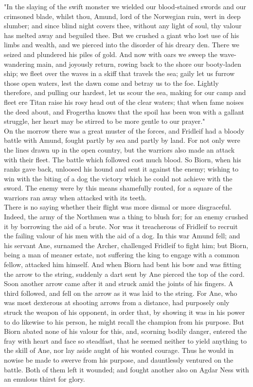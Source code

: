 \documentclass[10pt,a4paper]{report}
\begin{document}
"In the slaying of the swift monster we wielded our blood-stained swords and our crimsoned blade, whilst thou, Amund, lord of the Norwegian ruin, wert in deep slumber; and since blind night covers thee, without any light of soul, thy valour has melted away and beguiled thee. But we crushed a giant who lost use of his limbs and wealth, and we pierced into the disorder of his dreary den. There we seized and plundered his piles of gold. And now with oars we sweep the wave-wandering main, and joyously return, rowing back to the shore our booty-laden ship; we fleet over the waves in a skiff that travels the sea; gaily let us furrow those open waters, lest the dawn come and betray us to the foe. Lightly therefore, and pulling our hardest, let us scour the sea, making for our camp and fleet ere Titan raise his rosy head out of the clear waters; that when fame noises the deed about, and Frogertha knows that the spoil has been won with a gallant struggle, her heart may be stirred to be more gentle to our prayer."\\

On the morrow there was a great muster of the forces, and Fridleif had a bloody battle with Amund, fought partly by sea and partly by land. For not only were the lines drawn up in the open country, but the warriors also made an attack with their fleet. The battle which followed cost much blood. So Biorn, when his ranks gave back, unloosed his hound and sent it against the enemy; wishing to win with the biting of a dog the victory which he could not achieve with the sword. The enemy were by this means shamefully routed, for a square of the warriors ran away when attacked with its teeth.\\

There is no saying whether their flight was more dismal or more disgraceful. Indeed, the army of the Northmen was a thing to blush for; for an enemy crushed it by borrowing the aid of a brute. Nor was it treacherous of Fridleif to recruit the failing valour of his men with the aid of a dog. In this war Amund fell; and his servant Ane, surnamed the Archer, challenged Fridleif to fight him; but Biorn, being a man of meaner estate, not suffering the king to engage with a common fellow, attacked him himself. And when Biorn had bent his bow and was fitting the arrow to the string, suddenly a dart sent by Ane pierced the top of the cord. Soon another arrow came after it and struck amid the joints of his fingers. A third followed, and fell on the arrow as it was laid to the string. For Ane, who was most dexterous at shooting arrows from a distance, had purposely only struck the weapon of his opponent, in order that, by showing it was in his power to do likewise to his person, he might recall the champion from his purpose. But Biorn abated none of his valour for this, and, scorning bodily danger, entered the fray with heart and face so steadfast, that he seemed neither to yield anything to the skill of Ane, nor lay aside aught of his wonted courage. Thus he would in nowise be made to swerve from his purpose, and dauntlessly ventured on the battle. Both of them left it wounded; and fought another also on Agdar Ness with an emulous thirst for glory.\\
\end{document}
